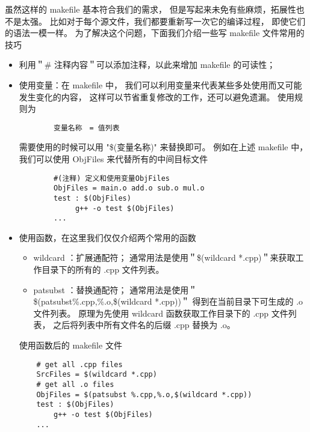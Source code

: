 虽然这样的 makefile 基本符合我们的需求，
但是写起来未免有些麻烦，拓展性也不是太强。
比如对于每个源文件，我们都要重新写一次它的编译过程，
即使它们的语法一模一样。
为了解决这个问题，下面我们介绍一些写 makefile 文件常用的技巧
\begin{itemize}
	\item 利用＂\# 注释内容＂可以添加注释，以此来增加 makefile 的可读性；
	\item 使用变量：在 makefile 中，
		我们可以利用变量来代表某些多处使用而又可能发生变化的内容，
		这样可以节省重复修改的工作，还可以避免遗漏。
		使用规则为
		\begin{verbatim}
		变量名称　= 值列表
		\end{verbatim}
		需要使用的时候可以用 "\$(变量名称)" 来替换即可。
		例如在上述 makefile 中，我们可以使用 ObjFiles 来代替所有的中间目标文件
		\begin{verbatim}
		#(注释) 定义和使用变量ObjFiles
		ObjFiles = main.o add.o sub.o mul.o
		test : $(ObjFiles)
  			 g++ -o test $(ObjFiles)
		...
		\end{verbatim}
	\item 使用函数，在这里我们仅仅介绍两个常用的函数
    \begin{itemize}
    	\item wildcard ：扩展通配符；
    		通常用法是使用＂\$(wildcard *.cpp)＂来获取工作目录下的所有的 .cpp 文件列表。
    	\item patsubst ：替换通配符；
    		通常用法是使用＂\$(patsubst\%.cpp,\%.o,\$(wildcard *.cpp))＂
    		得到在当前目录下可生成的 .o 文件列表。
    		原理为先使用 wildcard 函数获取工作目录下的 .cpp 文件列表，
    		之后将列表中所有文件名的后缀 .cpp 替换为 .o。
    \end{itemize}
    使用函数后的 makefile 文件
	\begin{verbatim}
	# get all .cpp files
	SrcFiles = $(wildcard *.cpp)
	# get all .o files
	ObjFiles = $(patsubst %.cpp,%.o,$(wildcard *.cpp))
	test : $(ObjFiles)
   		g++ -o test $(ObjFiles)
	... 
	\end{verbatim}
	

\end{itemize}
